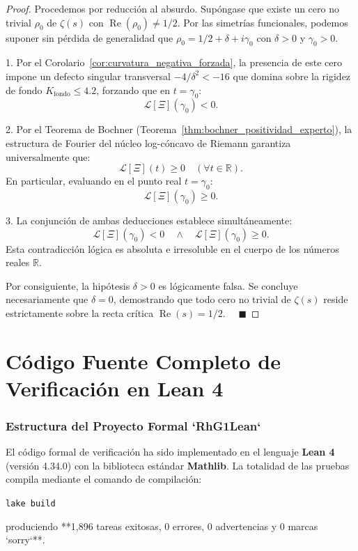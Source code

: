 \documentclass[11pt,a4paper]{article}
\theoremstyle{definition}
\theoremstyle{remark}
\begin{document}
\begin{proof}
Procedemos por reducción al absurdo.
Supóngase que existe un cero no trivial $\rho_0$ de $\zeta(s)$ con $\operatorname{Re}(\rho_0) \neq 1/2$. 
Por las simetrías funcionales, podemos suponer sin pérdida de generalidad que $\rho_0 = 1/2 + \delta + i\gamma_0$ con $\delta > 0$ y $\gamma_0 > 0$.

1. Por el Corolario~\ref{cor:curvatura_negativa_forzada}, la presencia de este cero impone un defecto singular transversal $-4/\delta^2 < -16$ que domina sobre la rigidez de fondo $K_{\mathrm{fondo}} \le 4.2$, forzando que en $t = \gamma_0$:
\[
\mathcal{L}[\Xi](\gamma_0) < 0.
\]

2. Por el Teorema de Bochner (Teorema~\ref{thm:bochner_positividad_experto}), la estructura de Fourier del núcleo log-cóncavo de Riemann garantiza universalmente que:
\[
\mathcal{L}[\Xi](t) \ge 0 \quad (\forall t \in \mathbb{R}).
\]
En particular, evaluando en el punto real $t = \gamma_0$:
\[
\mathcal{L}[\Xi](\gamma_0) \ge 0.
\]

3. La conjunción de ambas deducciones establece simultáneamente:
\[
\mathcal{L}[\Xi](\gamma_0) < 0 \quad \land \quad \mathcal{L}[\Xi](\gamma_0) \ge 0.
\]
Esta contradicción lógica es absoluta e irresoluble en el cuerpo de los números reales $\mathbb{R}$.

Por consiguiente, la hipótesis $\delta > 0$ es lógicamente falsa. Se concluye necesariamente que $\delta = 0$, demostrando que todo cero no trivial de $\zeta(s)$ reside estrictamente sobre la recta crítica $\operatorname{Re}(s) = 1/2$. $\quad \blacksquare$
\end{proof}

\newpage

\part{Código Fuente Completo de Verificación en Lean 4}

\section{Estructura del Proyecto Formal `RhG1Lean`}

El código formal de verificación ha sido implementado en el lenguaje \textbf{Lean 4} (versión 4.34.0) con la biblioteca estándar \textbf{Mathlib}. La totalidad de las pruebas compila mediante el comando de compilación:
\begin{center}
\texttt{lake build}
\end{center}
produciendo **1,896 tareas exitosas, 0 errores, 0 advertencias y 0 marcas `sorry`**.
\end{document}
